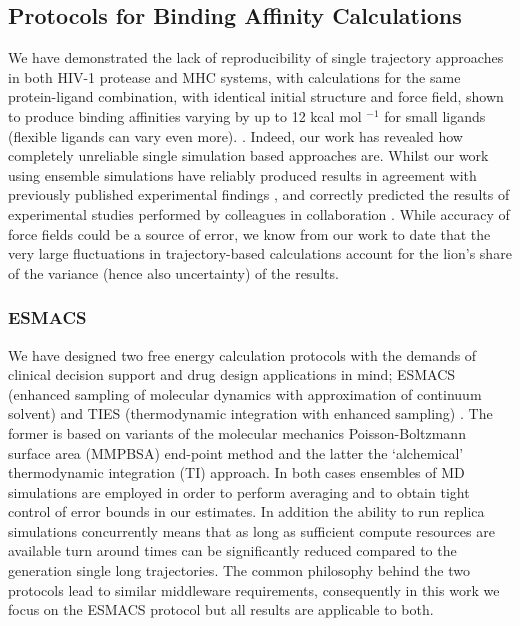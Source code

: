 
\subsection{Protocols for Binding Affinity Calculations}

We have demonstrated the lack of reproducibility of single trajectory
approaches in both HIV-1 protease and MHC systems, with calculations for the
same protein-ligand combination, with identical initial structure and force
field, shown to produce binding affinities varying by up to 12 kcal mol
$^{-1}$ for small ligands (flexible ligands can vary even more).
\cite{Wan2015, Sadiq2010, Wright2014}. Indeed, our work has revealed how
completely unreliable single simulation based approaches are. 
Whilst our work using ensemble simulations have reliably produced results 
in agreement with previously published experimental findings 
\cite{Sadiq2010, Wan2011, Wright2014, Bhati2017, Wan2017brd4, Wan2017trk}, 
and correctly predicted the results of experimental studies performed by
colleagues in collaboration \cite{Bunney2015}.
While accuracy of force fields could be a source of error, we know from our work to date
 that the very large fluctuations in trajectory-based calculations
account for the lion’s share of the variance (hence also uncertainty) of the
results. 



\subsubsection*{ESMACS}

We have designed two free energy calculation protocols with the demands of clinical 
decision support and drug design applications in mind; ESMACS (enhanced sampling
of molecular dynamics with approximation of continuum
solvent)\cite{Wan2017brd4} and TIES (thermodynamic integration with enhanced
sampling) \cite{Bhati2017}. The former is based on variants of the molecular
mechanics Poisson-Boltzmann surface area (MMPBSA) end-point method and the
latter the `alchemical' thermodynamic integration (TI) approach. In both cases
ensembles of MD simulations are employed in order to perform averaging and to
obtain tight control of error bounds in our estimates.
In addition the ability to run replica simulations concurrently means that as long 
as sufficient compute resources are available turn around times can be significantly 
reduced compared to the generation single long trajectories.
The common philosophy behind the two protocols lead to similar middleware requirements, 
consequently in this work we focus on the ESMACS protocol but all results are applicable 
to both.

